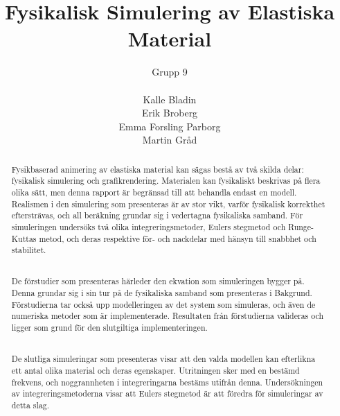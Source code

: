 \documentclass[a4paper,12pt,oneside,final,swedish]{extarticle}
\begin{document}
\author{Grupp 9\\\\Kalle Bladin\\Erik Broberg\\Emma Forsling Parborg\\Martin Gråd}
\title{Fysikalisk Simulering av Elastiska Material}
\clearpage\maketitle %
\thispagestyle{empty}

\pagebreak




\begin{abstract}
\thispagestyle{empty}
\noindent Fysikbaserad animering av elastiska material kan sägas bestå av två skilda delar: fysikalisk simulering och grafikrendering. Materialen kan fysikaliskt beskrivas på flera olika sätt, men denna rapport är begränsad till att behandla endast en modell. Realismen i den simulering som presenteras är av stor vikt, varför fysikalisk korrekthet eftersträvas, och all beräkning grundar sig i vedertagna fysikaliska samband. För simuleringen undersöks två olika integreringsmetoder, Eulers stegmetod och Runge-Kuttas metod, och deras respektive för- och nackdelar med hänsyn till snabbhet och stabilitet.

\noindent \\De förstudier som presenteras härleder den ekvation som simuleringen bygger på. Denna grundar sig i sin tur på de fysikaliska samband som presenteras i Bakgrund. Förstudierna tar också upp modelleringen av det system som simuleras, och även de numeriska metoder som är implementerade. Resultaten från förstudierna valideras och ligger som grund för den slutgiltiga implementeringen.

\noindent \\De slutliga simuleringar som presenteras visar att den valda modellen kan efterlikna ett antal olika material och deras egenskaper. Utritningen sker med en bestämd frekvens, och noggrannheten i integreringarna bestäms utifrån denna. Undersökningen av integreringsmetoderna visar att Eulers stegmetod är att föredra för simuleringar av detta slag.
\hfill
\end{abstract}
\pagebreak 
\end{document}

